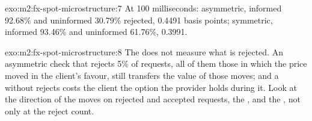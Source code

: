\begin{solution}{exo:m2:fx-spot-microstructure:7}
At 100 milliseconds: asymmetric, informed 92.68\% and uninformed 30.79\%
rejected,  0.4491 basis points; symmetric, informed 93.46\% and
uninformed 61.76\%,  0.3991.
\end{solution}

\begin{solution}{exo:m2:fx-spot-microstructure:8}
The  does not measure what is rejected. An asymmetric check that
rejects 5\% of requests, all of them those in which the price moved in the
client's favour, still transfers the value of those moves; and a 
without rejects costs the client the option the provider holds during it. Look
at the direction of the moves on rejected and accepted requests, the ,
and the , not only at the reject count.
\end{solution}

